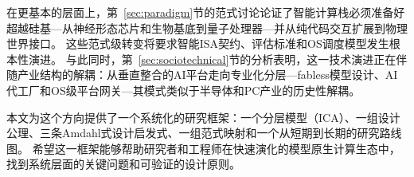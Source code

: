 在更基本的层面上，第~\ref{sec:paradigm}节的范式讨论论证了智能计算栈必须准备好超越硅基---从神经形态芯片和生物基底到量子处理器---并从纯代码交互扩展到物理世界接口。
这些范式级转变将要求智能ISA契约、评估标准和OS调度模型发生根本性演进。
与此同时，第~\ref{sec:sociotechnical}节的分析表明，这一技术演进正在伴随产业结构的解耦：从垂直整合的AI平台走向专业化分层---fabless模型设计、AI代工厂和OS级平台网关---其模式类似于半导体和PC产业的历史性解耦。

本文为这个方向提供了一个系统化的研究框架：一个分层模型（ICA）、一组设计公理、三条Amdahl式设计启发式、一组范式映射和一个从短期到长期的研究路线图。
希望这一框架能够帮助研究者和工程师在快速演化的模型原生计算生态中，找到系统层面的关键问题和可验证的设计原则。

